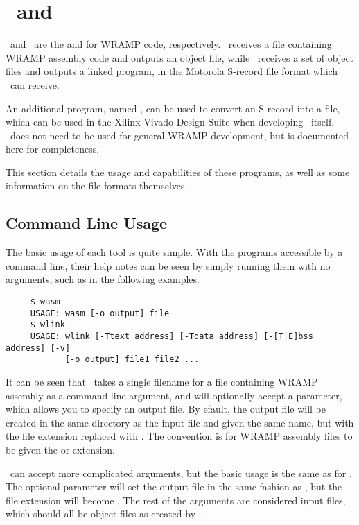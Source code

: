 \setcounter{secnumdepth}{0}

\section{\wasm\ and \wlink}

\wasm\ and \wlink\ are the  and  for WRAMP code,
respectively. \wasm\ receives a file containing WRAMP assembly code and
outputs an object file, while \wlink\ receives a set of object files
and outputs a linked program, in the Motorola S-record file format which
\WRAMPmon\ can receive.

An additional program, named \trim, can be used to convert an S-record
into a  file, which can be used in the Xilinx Vivado Design
Suite when developing \WRAMPmon\ itself. \trim\ does not need to be
used for general WRAMP development, but is documented here for completeness.

This section details the usage and capabilities of these programs, as well as
some information on the file formats themselves.

\subsection{Command Line Usage}

The basic usage of each tool is quite simple. With the programs accessible by
a command line, their help notes can be seen by simply running them with no
arguments, such as in the following examples.

\begin{verbatim}
     $ wasm
     USAGE: wasm [-o output] file
     $ wlink
     USAGE: wlink [-Ttext address] [-Tdata address] [-[T|E]bss address] [-v] 
            [-o output] file1 file2 ...
\end{verbatim}

It can be seen that \wasm\ takes a single filename for a file containing
WRAMP assembly as a command-line argument, and will optionally accept a
 parameter, which allows you to specify an output file. By 
efault, the output file will be created in the same directory as the input
file and given the same name, but with the file extension replaced with
. The convention is for WRAMP assembly files to be given the
 or  extension.

\wlink\ can accept more complicated arguments, but the basic usage is
the same as for \wasm. The optional  parameter will set
the output file in the same fashion as \wasm, but the file extension will
become . The rest of the arguments are considered input files,
which should all be object files as created by \wasm.

